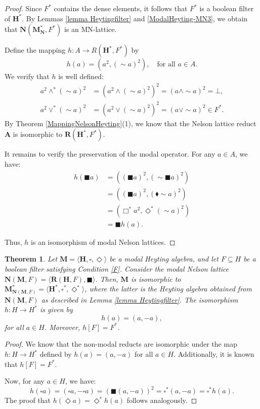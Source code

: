 \documentclass[pdflatex,sn-mathphys-num]{sn-jnl}%
\newcommand{\A}{\mathbf{A}}
\newcommand{\R}[2]{\mathbf{R}(#1,#2)}
\newcommand{\He}{\mathbf{H}}
\newcommand{\RN}[2]{R(#1,#2)}
\theoremstyle{thmstyleone}%
\newtheorem{theorem}{Theorem}%
\theoremstyle{thmstyletwo}%
\theoremstyle{thmstylethree}%
\begin{document}
\begin{proof}
Since $F^*$ contains the dense elements, it follows that $F^*$ is a boolean filter of $\mathbf{H}^*$. By Lemmas \ref{lemma Heytingfilter} and \ref{ModalHeyting-MN3}, we obtain that $\mathbf{N}(\mathbf{M}_\mathbf{N}^*, F^*)$ is an MN-lattice.

Define the mapping $h: A \to \RN{\He^*}{F^*}$ by 
\[
h(a) = (a^2, (\sim a)^2), \quad \text{for all } a \in A.
\]
We verify that $h$ is well defined: 
\begin{align*}
    a^2 \wedge^* (\sim a)^2 &= (a^2 \wedge (\sim a)^2)^2 = (a \wedge \sim a)^2 = \bot, \\
    a^2 \vee^* (\sim a)^2 &= (a^2 \vee (\sim a)^2)^2 = (a \vee \sim a)^2 \in F^*.
\end{align*}
By Theorem \ref{MappingNelsonHeyting}(1), we know that the Nelson lattice reduct $\A$ is isomorphic to $\R{\He^*}{F^*}$.

It remains to verify the preservation of the modal operator. For any $a \in A$, we have:
\begin{align*}
    h(\blacksquare a) &= ((\blacksquare a)^2, (\sim \blacksquare a)^2) \\
    &= ((\blacksquare a)^2, (\blacklozenge \sim a)^2) \\
    &= (\Box^* a^2, \Diamond^* (\sim a)^2) \\
    &= \blacksquare h(a).
\end{align*}

Thus, $h$ is an isomorphism of modal Nelson lattices.
\end{proof}

\begin{theorem} \label{Canonicalmapping}
    Let $\mathbf{M} = \langle \He, \square, \Diamond \rangle$ be a modal Heyting algebra, and let $F \subseteq H$ be a boolean filter satisfying Condition \eqref{F}. Consider the modal Nelson lattice $\mathbf{N}(\mathbf{M},F) = \langle \R{\He}{F},\blacksquare\rangle$. Then, $\mathbf{M}$ is isomorphic to $\mathbf{M}_{\mathbf{N}(\mathbf{M},F)}^* = \langle \He^*, \square^*, \Diamond^* \rangle$, where the latter is the Heyting algebra obtained from $\mathbf{N}(\mathbf{M},F)$ as described in Lemma \ref{lemma Heytingfilter}. The isomorphism $h\colon H \to H^*$ is given by  
    \[
    h(a) = (a, -a),
    \]
    for all $a \in H$. Moreover, $h[F] = F^*$.
\end{theorem}
\begin{proof} 
We know that the non-modal reducts are isomorphic under the map $h\colon H \to H^*$ defined by $h(a) = (a, -a)$ for all $a \in H$. Additionally, it is known that $h[F] = F^*$.

Now, for any $a \in H$, we have:
\[
h(\square a) = (\square a, -\square a) = (\blacksquare (a, -a))^2 = \square^*(a, -a) = \square^* h(a).
\]
The proof that $h(\Diamond a) = \Diamond^* h(a)$ follows analogously.
\end{proof}
\end{document}
